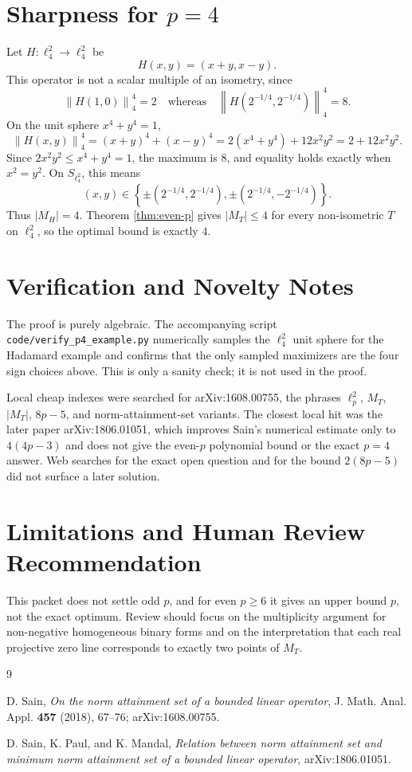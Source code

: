 \documentclass[11pt]{amsart}
\newcommand{\norm}[1]{\left\lVert #1\right\rVert}
\begin{document}
\section*{Sharpness for \(p=4\)}

Let \(H:\ell_4^2\to\ell_4^2\) be
\[
  H(x,y)=(x+y,x-y).
\]
This operator is not a scalar multiple of an isometry, since
\[
  \norm{H(1,0)}_4^4=2
  \quad\text{whereas}\quad
  \norm{H(2^{-1/4},2^{-1/4})}_4^4=8 .
\]
On the unit sphere \(x^4+y^4=1\),
\[
  \norm{H(x,y)}_4^4
  =(x+y)^4+(x-y)^4
  =2(x^4+y^4)+12x^2y^2
  =2+12x^2y^2 .
\]
Since \(2x^2y^2\le x^4+y^4=1\), the maximum is \(8\), and equality holds
exactly when \(x^2=y^2\).  On \(S_{\ell_4^2}\), this means
\[
  (x,y)\in
  \left\{
    \pm(2^{-1/4},2^{-1/4}),
    \pm(2^{-1/4},-2^{-1/4})
  \right\}.
\]
Thus \(|M_H|=4\).  Theorem \ref{thm:even-p} gives \(|M_T|\le 4\) for every
non-isometric \(T\) on \(\ell_4^2\), so the optimal bound is exactly \(4\).

\section*{Verification and Novelty Notes}

The proof is purely algebraic.  The accompanying script
\texttt{code/verify\_p4\_example.py} numerically samples the \(\ell_4^2\)
unit sphere for the Hadamard example and confirms that the only sampled
maximizers are the four sign choices above.  This is only a sanity check; it
is not used in the proof.

Local cheap indexes were searched for arXiv:1608.00755, the phrases
\(\ell_p^2\), \(M_T\), \(|M_T|\), \(8p-5\), and norm-attainment-set variants.
The closest local hit was the later paper arXiv:1806.01051, which improves
Sain's numerical estimate only to \(4(4p-3)\) and does not give the even-\(p\)
polynomial bound or the exact \(p=4\) answer.  Web searches for the exact open
question and for the bound \(2(8p-5)\) did not surface a later solution.

\section*{Limitations and Human Review Recommendation}

This packet does not settle odd \(p\), and for even \(p\ge 6\) it gives an
upper bound \(p\), not the exact optimum.  Review should focus on the
multiplicity argument for non-negative homogeneous binary forms and on the
interpretation that each real projective zero line corresponds to exactly two
points of \(M_T\).

\begin{thebibliography}{9}

D. Sain,
\emph{On the norm attainment set of a bounded linear operator},
J. Math. Anal. Appl. \textbf{457} (2018), 67--76;
arXiv:1608.00755.

D. Sain, K. Paul, and K. Mandal,
\emph{Relation between norm attainment set and minimum norm attainment set of
a bounded linear operator},
arXiv:1806.01051.

\end{thebibliography}
\end{document}
